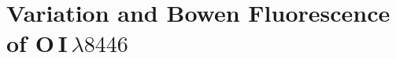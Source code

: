 
\section{Variation and Bowen Fluorescence of O\,\textsc{I}$\,\lambda 8446$}
\label{sec:BF_Analysis}

